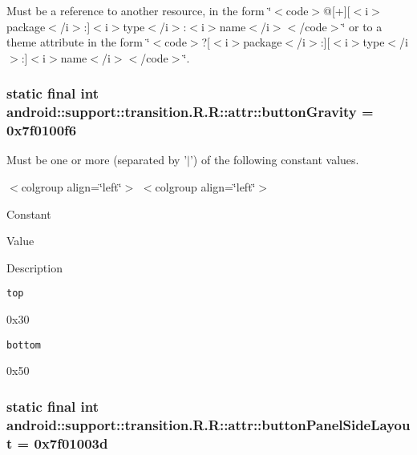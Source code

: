 Must be a reference to another resource, in the form \char`\"{}$<$code$>$@\mbox{[}+\mbox{]}\mbox{[}$<$i$>$package$<$/i$>$:\mbox{]}$<$i$>$type$<$/i$>$:$<$i$>$name$<$/i$>$$<$/code$>$\char`\"{} or to a theme attribute in the form \char`\"{}$<$code$>$?\mbox{[}$<$i$>$package$<$/i$>$:\mbox{]}\mbox{[}$<$i$>$type$<$/i$>$:\mbox{]}$<$i$>$name$<$/i$>$$<$/code$>$\char`\"{}. \hypertarget{classandroid_1_1support_1_1transition_1_1_r_1_1attr_47f711430770c37ed6fe0809f4486c20}{
\subsubsection[{buttonGravity}]{\setlength{\rightskip}{0pt plus 5cm}static final int android::support::transition.R.R::attr::buttonGravity = 0x7f0100f6}}
\label{classandroid_1_1support_1_1transition_1_1_r_1_1attr_47f711430770c37ed6fe0809f4486c20}


Must be one or more (separated by '$|$') of the following constant values. \begin{TabularC}{0}
\hline
\end{TabularC}
$<$colgroup align=\char`\"{}left\char`\"{}$>$ $<$colgroup align=\char`\"{}left\char`\"{}$>$ 

Constant

Value

Description 

{\tt top}

0x30

{\tt bottom}

0x50\hypertarget{classandroid_1_1support_1_1transition_1_1_r_1_1attr_3e93d0ce5973a887ddd1780ee627e213}{
\subsubsection[{buttonPanelSideLayout}]{\setlength{\rightskip}{0pt plus 5cm}static final int android::support::transition.R.R::attr::buttonPanelSideLayout = 0x7f01003d}}
\label{classandroid_1_1support_1_1transition_1_1_r_1_1attr_3e93d0ce5973a887ddd1780ee627e213}


